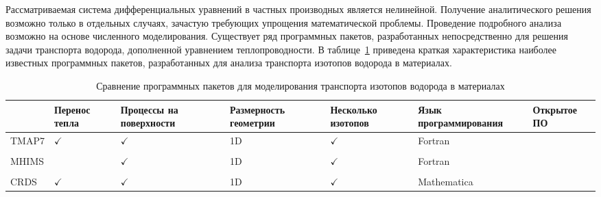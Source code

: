 Рассматриваемая система дифференциальных уравнений в частных производных является нелинейной. Получение аналитического решения возможно только в отдельных случаях, зачастую требующих упрощения математической проблемы. Проведение подробного анализа возможно на основе численного моделирования. Существует ряд программных пакетов, разработанных непосредственно для решения задачи транспорта водорода, дополненной уравнением теплопроводности. В таблице~\cref{tab:codes} приведена краткая характеристика наиболее известных программных пакетов, разработанных для анализа транспорта изотопов водорода в материалах.
\begin{table}[ht]
    \centering
    \begin{threeparttable}
        \caption{Сравнение программных пакетов для моделирования транспорта изотопов водорода в материалах}
        \label{tab:codes}
        \small
        \renewcommand{\arraystretch}{1.2}%
        \begin{tabularx}{\linewidth}{@{}>{\raggedright}X>{\centering\arraybackslash}X>{\centering\arraybackslash}X>{\centering\arraybackslash}X>{\centering\arraybackslash}X>{\centering\arraybackslash}X>{\centering\arraybackslash}X}
            \toprule
                                           & Перенос тепла & Процессы на поверхности & Размерность геометрии & Несколько изотопов & Язык программирования & Открытое ПО  \\
            \hline
            \hline
            TMAP7                          & $\checkmark$  & $\checkmark$            & 1D                    & $\checkmark$       & Fortran               &              \\
            \cite{GlenRLonghurst2008}      &               &                         &                       &                    &                       &              \\
            MHIMS                          &               & $\checkmark$            & 1D                    & $\checkmark$       & Fortran               &              \\
            \cite{Hodille2024}             &               &                         &                       &                    &                       &              \\
            CRDS                           & $\checkmark$  & $\checkmark$            & 1D                    & $\checkmark$       & Mathematica           &              \\

\end{tabularx}
\end{threeparttable}
\end{table}
